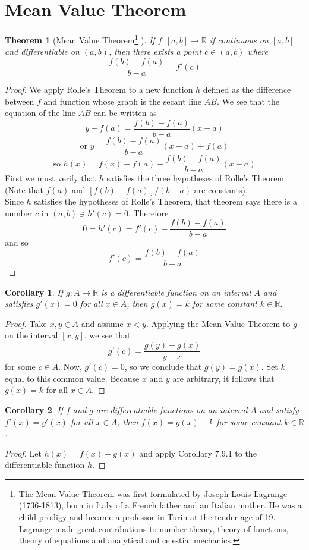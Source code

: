 \documentclass[10pt]{report}
\newtheorem{thm2}{Theorem}[section]
\newtheorem{cor2}{Corollary}[section]
\begin{document}
\section{Mean Value Theorem}
\begin{thm2}[Mean Value Theorem\footnote{The Mean Value Theorem was first formulated by Joseph-Louis Lagrange (1736-1813), born in Italy of a French father and an Italian mother. He was a child prodigy and became a professor in Turin at the tender age of 19. Lagrange made great contributions to number theory, theory of functions, theory of equations and analytical and celestial mechanics.} ]
If $f:[a,b]\to\mathbb{R}$ if continuous on $[a,b]$ and differentiable on $(a,b)$, then there exists a point $c\in (a,b)$ where $$\frac{f(b)-f(a)}{b-a}=f'(c)$$
\end{thm2}
\begin{proof}
We apply Rolle's Theorem to a new function $h$ defined as the difference between $f$ and function whose graph is the secant line $AB$. We see that the equation of the line $AB$ can be written as
$$y-f(a)=\frac{f(b)-f(a)}{b-a}(x-a)$$
$$\text{or  } y=\frac{f(b)-f(a)}{b-a}(x-a)+f(a)$$
$$\text{so  }h(x)=f(x)-f(a)-\frac{f(b)-f(a)}{b-a}(x-a)$$
First we must verify that $h$ satisfies the three hypotheses of Rolle's Theorem (Note that $f(a)$ and $[f(b)-f(a)]/(b-a)$ are constants). \\
Since $h$ satisfies the hypotheses of Rolle's Theorem, that theorem says there is a number $c$ in $(a,b)\ni h'(c)=0$. Therefore
$$0=h'(c)=f'(c)-\frac{f(b)-f(a)}{b-a}$$
and so
$$f'(c)=\frac{f(b)-f(a)}{b-a}$$
\end{proof}
\begin{cor2}
If $g:A\to\mathbb{R}$ is a  differentiable function on an interval $A$ and satisfies $g'(x)=0$ for all $x\in A$, then $g(x)=k$ for some constant $k\in\mathbb{R}$.
\end{cor2}
\begin{proof}
Take $x,y\in A$ and assume $x<y$. Applying the Mean Value Theorem to $g$ on the interval $[x,y]$, we see that
$$g'(c) = \frac{g(y)-g(x)}{y-x}$$
for some $c\in A$. Now, $g'(c)=0$, so we conclude that $g(y)=g(x)$. Set $k$ equal to this common value. Because $x$ and $y$ are arbitrary, it follows that $g(x) = k$ for all $x\in A$.
\end{proof}
\begin{cor2}
If $f$ and $g$ are differentiable functions on an interval $A$ and satisfy $f'(x) = g'(x)$ for all $x\in A$, then $f(x)=g(x) + k$ for some constant $k\in\mathbb{R}$.
\end{cor2}
\begin{proof}
Let $h(x) = f(x) - g(x)$ and apply Corollary 7.9.1 to the differentiable function $h$.
\end{proof}
\end{document}
